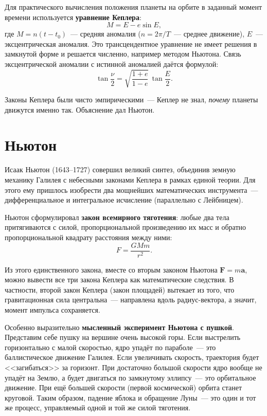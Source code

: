 \documentclass[12pt,a4paper]{article}
\begin{document}
Для практического вычисления положения планеты на орбите в заданный момент
времени используется \textbf{уравнение Кеплера}:
\begin{equation}
  M = E - e \sin E,
\end{equation}
где $M = n(t - t_0)$~--- средняя аномалия ($n = 2\pi / T$~--- среднее
движение), $E$~--- эксцентрическая аномалия. Это трансцендентное уравнение
не имеет решения в замкнутой форме и решается численно, например методом
Ньютона. Связь эксцентрической аномалии с истинной аномалией даётся
формулой:
\begin{equation}
  \tan\frac{\nu}{2} = \sqrt{\frac{1+e}{1-e}} \, \tan\frac{E}{2}.
\end{equation}

Законы Кеплера были чисто эмпирическими~--- Кеплер не знал, \emph{почему}
планеты движутся именно так. Объяснение дал Ньютон.

\section{Ньютон}

Исаак Ньютон (1643--1727) совершил великий синтез, объединив земную механику
Галилея с небесными законами Кеплера в рамках единой теории. Для этого ему
пришлось изобрести два мощнейших математических инструмента~---
дифференциальное и интегральное исчисление (параллельно с Лейбницем).

Ньютон сформулировал \textbf{закон всемирного тяготения}: любые два тела
притягиваются с силой, пропорциональной произведению их масс и обратно
пропорциональной квадрату расстояния между ними:
\begin{equation}
  F = \frac{G M m}{r^2}.
\end{equation}

Из этого единственного закона, вместе со вторым законом Ньютона
$\mathbf{F} = m \mathbf{a}$, можно вывести все три закона Кеплера как
математические следствия. В частности, второй закон Кеплера (закон
площадей) вытекает из того, что гравитационная сила центральна~--- направлена
вдоль радиус-вектора, а значит, момент импульса сохраняется.

Особенно выразительно \textbf{мысленный эксперимент Ньютона с пушкой}.
Представим себе пушку на вершине очень высокой горы. Если выстрелить
горизонтально с малой скоростью, ядро упадёт по параболе~--- это
баллистическое движение Галилея. Если увеличивать скорость, траектория
будет <<загибаться>> за горизонт. При достаточно большой скорости ядро
вообще не упадёт на Землю, а будет двигаться по замкнутому эллипсу~---
это орбитальное движение. При ещё большей скорости (первой космической)
орбита станет круговой. Таким образом, падение яблока и обращение Луны~---
это один и тот же процесс, управляемый одной и той же силой тяготения.
\end{document}
